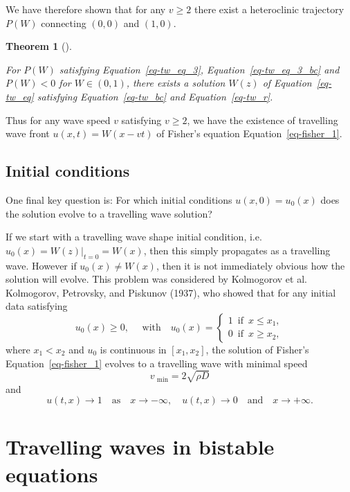 \documentclass[
  letterpaper,
  DIV=11,
  numbers=noendperiod]{scrreprt}
\theoremstyle{plain}
\newtheorem{theorem}{Theorem}[chapter]
\theoremstyle{definition}
\theoremstyle{plain}
\theoremstyle{remark}
\begin{document}
We have therefore shown that for any \(v\geq 2\) there exist a
heteroclinic trajectory \(P(W)\) connecting \((0,0)\) and \((1,0)\).

\begin{theorem}[]\protect\hypertarget{thm-trwaveexistence}{}\label{thm-trwaveexistence}

For \(P(W)\) satisfying Equation~\ref{eq-tw_eq_3},
Equation~\ref{eq-tw_eq_3_bc} and \(P(W) < 0\) for \(W \in (0,1)\), there
exists a solution \(W(z)\) of Equation~\ref{eq-tw_eq} satisfying
Equation~\ref{eq-tw_bc} and Equation~\ref{eq-tw_r}.

\end{theorem}

Thus for any wave speed \(v\) satisfying \(v \geq 2\), we have the
existence of travelling wave front \(u(x,t)= W(x- vt)\) of Fisher's
equation Equation~\ref{eq-fisher_1}.

\hypertarget{initial-conditions-1}{%
\subsection{Initial conditions}\label{initial-conditions-1}}

One final key question is: For which initial conditions
\(u(x,0) = u_0(x)\) does the solution evolve to a travelling wave
solution?

If we start with a travelling wave shape initial condition,
i.e.~\(u_0(x)= W(z)|_{t=0} = W(x)\), then this simply propagates as a
travelling wave. However if \(u_0(x)\neq W(x)\), then it is not
immediately obvious how the solution will evolve. This problem was
considered by Kolmogorov et al. Kolmogorov, Petrovsky, and Piskunov
(1937), who showed that for any initial data satisfying \[
 u_0(x) \geq 0, \quad \text{ with} \quad  u_0(x) = \begin{cases} 1 \, \text{ if } \, x \leq x_1, \\
 0 \, \text{ if } \, x \geq x_2, 
 \end{cases}
 \] where \(x_1 < x_2\) and \(u_0\) is continuous in \([x_1, x_2]\), the
solution of Fisher's Equation~\ref{eq-fisher_1} evolves to a travelling
wave with minimal speed \[
 v_\text{ min} = 2 \sqrt{ \rho D}
\] and \[
u(t,x) \rightarrow 1 \quad \textrm{as} \quad x\rightarrow -\infty, \quad u(t,x) \rightarrow 0 \quad \textrm{and} \quad  x\rightarrow +\infty.
\]

\hypertarget{travelling-waves-in-bistable-equations}{%
\section{Travelling waves in bistable
equations}\label{travelling-waves-in-bistable-equations}}
\end{document}
